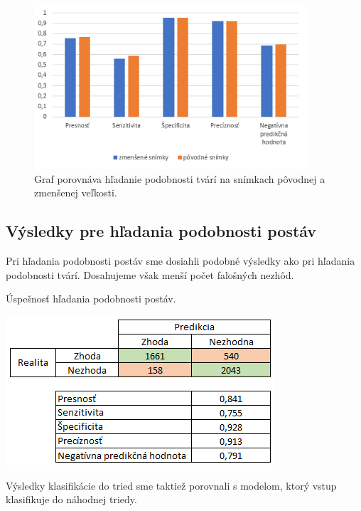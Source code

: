 \begin{figure}[H]
\centerline{\includegraphics[width=0.9\textwidth]{images/graph_face12_compare.png}}
\caption[Porovnanie hľadania podobnosti tvárí na snímkach pôvodnej a zmenšenej veľkosti]{Graf porovnáva hľadanie podobnosti tvárí na snímkach pôvodnej a zmenšenej veľkosti.}
\label{obr:graph_face12_compare}
\end{figure}


\subsection{Výsledky pre hľadania podobnosti postáv}
Pri hľadania podobnosti postáv sme dosiahli podobné výsledky ako pri hľadania podobnosti tvárí.
Dosahujeme však menší počet falošných nezhôd.
\begin{table}[H]
  \caption[Úspešnosť hľadania podobnosti postáv]{Úspešnosť hľadania podobnosti postáv.}
  \label{tbl:body1_table}
  \begin{center}
  \includegraphics{images/body1_table}
  \end{center}
\end{table}

Výsledky klasifikácie do tried sme taktiež porovnali s modelom, ktorý vstup klasifikuje do náhodnej triedy.

